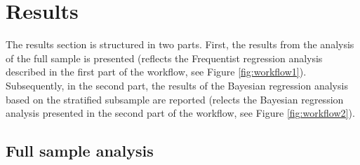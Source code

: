\documentclass[12pt,twoside]{reedthesis}
\begin{document}
\hypertarget{results}{%
\chapter{Results}\label{results}}

The results section is structured in two parts. First, the results from the analysis of the full sample is presented (reflects the Frequentist regression analysis described in the first part of the workflow, see Figure \ref{fig:workflow1}). Subsequently, in the second part, the results of the Bayesian regression analysis based on the stratified subsample are reported (relects the Bayesian regression analysis presented in the second part of the workflow, see Figure \ref{fig:workflow2}).

\hypertarget{full_results}{%
\section{Full sample analysis}\label{full_results}}
\end{document}
